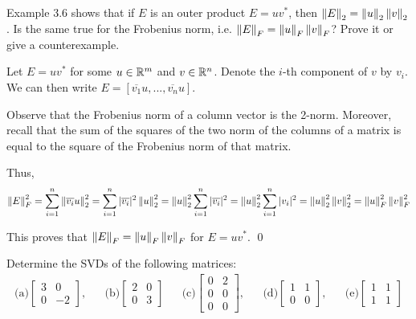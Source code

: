 \documentclass[10pt]{article}
\begin{document}
\maketitle

\begin{problem}[Exercise 3.5]
Example 3.6 shows that if \( E \) is an outer product \( E=uv^* \), then \( \left\lVert E\right\rVert_2=\left\lVert u\right\rVert_2\left\lVert v\right\rVert_2 \). Is the same true for the Frobenius norm, i.e. \( \left\lVert E\right\rVert_F = \left\lVert u\right\rVert_F \left\lVert v\right\rVert_F \)? Prove it or give a counterexample.
\end{problem}

\begin{solution}[Solution]
    Let \( E=uv^* \) for some \( u\in \mathbb{R}^m \) and \( v\in \mathbb{R}^n \). Denote the \( i \)-th component of \( v \) by \( v_i \).
We can then write \( E=[\overline{v_1}u, ..., \overline{v_n}u] \).

Observe that the Frobenius norm of a column vector is the 2-norm. Moreover, recall that the sum of the squares of the two norm of the columns of a matrix is equal to the square of the Frobenius norm of that matrix.

Thus,
\[ \left\lVert E\right\rVert_F^2 = \sum_{i=1}^{n}\left\lVert\overline{v_i}u\right\rVert_2^2 = \sum_{i=1}^{n}|\overline{v_i}|^2 \left\lVert u\right\rVert_2^2 = \left\lVert u\right\rVert_2^2 \sum_{i=1}^{n}|\overline{v_i}|^2 = \left\lVert u\right\rVert_2^2 \sum_{i=1}^{n}|v_i|^2  =\left\lVert u\right\rVert_2^2 \left\lVert v\right\rVert_2^2 = \left\lVert u\right\rVert_F^2 \left\lVert v\right\rVert_F^2  \]


This proves that \( \left\lVert E\right\rVert_F = \left\lVert u\right\rVert_F \left\lVert v\right\rVert_F \) for \( E=uv^* \). \qed

\end{solution}

\begin{problem}[Exercise 4.1]
    Determine the SVDs of the following matrices:
\begin{align*}
    \text{(a)} \left[\begin{array}{cc}3 & 0\\0 & -2\end{array}\right], && \text{(b)} \left[\begin{array}{cc}2 & 0\\0 & 3\end{array}\right] && \text{(c)} \left[\begin{array}{cc}0 & 2\\0 & 0\\0 & 0\end{array}\right], && \text{(d)} \left[\begin{array}{cc}1 & 1\\0 & 0\end{array}\right], && \text{(e)} \left[\begin{array}{cc}1 & 1 \\1 & 1\end{array}\right]
\end{align*}
\end{problem}
\end{document}
